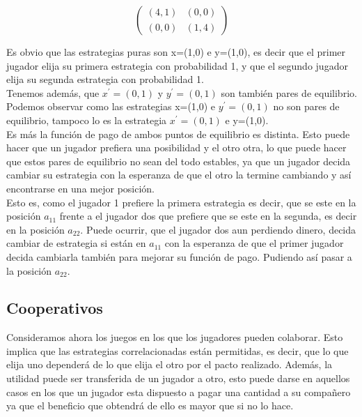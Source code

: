 \documentclass[10pt,a4paper]{book}
\begin{document}
\begin{equation}
	\begin{pmatrix}
		(4,1) & (0,0) \\
		(0,0) & (1,4)
	\end{pmatrix}
\end{equation}

Es obvio que las estrategias puras son x=(1,0) e y=(1,0), es decir que el primer jugador elija su primera estrategia con probabilidad 1, y que el segundo jugador elija su segunda estrategia con probabilidad 1.\\
Tenemos además, que $x^{'}=(0,1)$ y $y^{'}=(0,1)$ son también pares de equilibrio.\\
Podemos observar como las estrategias x=(1,0) e $y^{'}=(0,1)$ no son pares de equilibrio, tampoco lo es la estrategia  $x^{'}=(0,1)$ e y=(1,0).\\
Es más la función de pago de ambos puntos de equilibrio es distinta. Esto puede hacer que un jugador prefiera una posibilidad y el otro otra, lo que puede hacer que estos pares de equilibrio no sean del todo estables, ya que un jugador decida cambiar su estrategia con la esperanza de que el otro la termine cambiando y así encontrarse en una mejor posición.\\
Esto es, como el jugador 1 prefiere la primera estrategia es decir, que se este en la posición $a_{11}$ frente a el jugador dos que prefiere que se este en la segunda, es decir en la posición $a_{22}$. Puede ocurrir, que el jugador dos aun perdiendo dinero, decida cambiar de estrategia si están en $a_{11}$ con la esperanza de que el primer jugador decida cambiarla también para mejorar su función de pago. Pudiendo así pasar a la posición $a_{22}$.\\


\subsection{Cooperativos}

Consideramos ahora los juegos en los que los jugadores pueden colaborar. Esto implica que las estrategias correlacionadas están permitidas, es decir, que lo que elija uno dependerá de lo que elija el otro por el pacto realizado. Además, la utilidad puede ser transferida de un jugador a otro, esto puede darse en aquellos casos en los que un jugador esta dispuesto a pagar una cantidad a su compañero ya que el beneficio que obtendrá de ello es mayor que si no lo hace.\\
\end{document}
